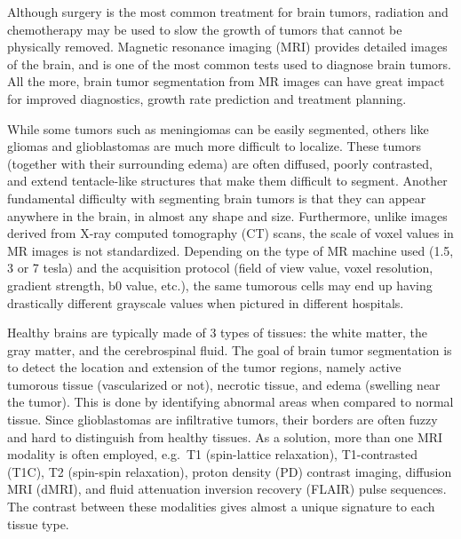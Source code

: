 \documentclass[final,5p,times,twocolumn]{elsarticle}
\begin{document}
Although surgery is the most common treatment for brain tumors, radiation and chemotherapy may be used to slow the growth of tumors that cannot be physically removed. Magnetic resonance imaging (MRI) provides detailed images of the brain, and is one of the most common tests used to diagnose brain tumors. All the more, brain tumor segmentation from MR images can have great impact for improved diagnostics, growth rate prediction and treatment planning.





While some tumors such as meningiomas can be easily segmented, others like gliomas and glioblastomas are much more difficult to localize.  These tumors (together with their surrounding edema) are often diffused, poorly contrasted, and extend tentacle-like structures that make them difficult to segment.  Another fundamental difficulty with segmenting brain tumors is that they can appear anywhere in the brain, in almost any shape and size.  
Furthermore, unlike images derived from X-ray computed tomography (CT) scans, the scale of voxel values in MR images is not standardized.
Depending on the type of MR machine used (1.5, 3 or 7 tesla) and the acquisition protocol (field of view value, voxel resolution, gradient strength, b0 value, etc.), the same tumorous cells may end up having drastically different grayscale values when pictured in different hospitals.




Healthy brains are typically made of 3 types of tissues: the white matter, the gray matter, and the cerebrospinal fluid.  The goal of brain tumor segmentation is to detect the location and extension of the tumor regions, namely active tumorous tissue (vascularized or not), necrotic tissue, and edema (swelling near the tumor). This is done by identifying abnormal areas when compared to normal tissue.  Since glioblastomas are infiltrative tumors, their borders are often fuzzy and hard to distinguish from healthy tissues.  As a solution, more than one MRI modality is often employed, e.g.\ T1 (spin-lattice relaxation), T1-contrasted (T1C), T2 (spin-spin relaxation), proton density (PD) contrast imaging, diffusion MRI (dMRI), and fluid attenuation inversion recovery (FLAIR) pulse sequences. The contrast between these modalities gives almost a unique signature to each tissue type.
\end{document}
